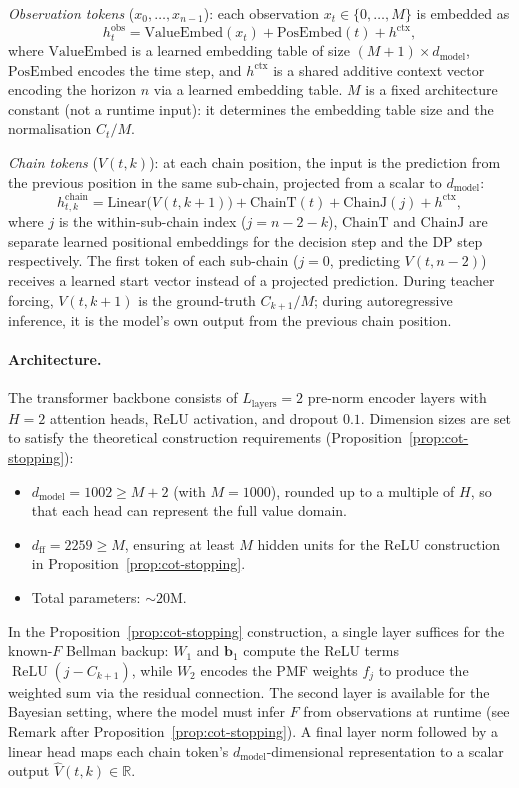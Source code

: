 \emph{Observation tokens} ($x_0, \ldots, x_{n-1}$): each observation $x_t \in \{0, \ldots, M\}$ is embedded as
\[
  h_t^{\mathrm{obs}} = \mathrm{ValueEmbed}(x_t) + \mathrm{PosEmbed}(t) + h^{\mathrm{ctx}},
\]
where $\mathrm{ValueEmbed}$ is a learned embedding table of size $(M{+}1) \times d_{\mathrm{model}}$, $\mathrm{PosEmbed}$ encodes the time step, and $h^{\mathrm{ctx}}$ is a shared additive context vector encoding the horizon $n$ via a learned embedding table. $M$ is a fixed architecture constant (not a runtime input): it determines the embedding table size and the normalisation $C_t / M$.

\emph{Chain tokens} ($V(t,k)$): at each chain position, the input is the prediction from the previous position in the same sub-chain, projected from a scalar to $d_{\mathrm{model}}$:
\[
  h^{\mathrm{chain}}_{t,k} = \mathrm{Linear}\bigl(V(t, k{+}1)\bigr) + \mathrm{ChainT}(t) + \mathrm{ChainJ}(j) + h^{\mathrm{ctx}},
\]
where $j$ is the within-sub-chain index ($j = n{-}2{-}k$), $\mathrm{ChainT}$ and $\mathrm{ChainJ}$ are separate learned positional embeddings for the decision step and the DP step respectively. The first token of each sub-chain ($j=0$, predicting $V(t, n{-}2)$) receives a learned start vector instead of a projected prediction. During teacher forcing, $V(t, k{+}1)$ is the ground-truth $C_{k+1}/M$; during autoregressive inference, it is the model's own output from the previous chain position.

\paragraph{Architecture.}
The transformer backbone consists of $L_{\mathrm{layers}} = 2$ pre-norm encoder layers with $H = 2$ attention heads, ReLU activation, and dropout $0.1$. Dimension sizes are set to satisfy the theoretical construction requirements (Proposition~\ref{prop:cot-stopping}):
\begin{itemize}
    \item $d_{\mathrm{model}} = 1002 \ge M + 2$ (with $M = 1000$), rounded up to a multiple of $H$, so that each head can represent the full value domain.
    \item $d_{\mathrm{ff}} = 2259 \ge M$, ensuring at least $M$ hidden units for the ReLU construction in Proposition~\ref{prop:cot-stopping}.
    \item Total parameters: ${\sim}20$M.
\end{itemize}
In the Proposition~\ref{prop:cot-stopping} construction, a single layer suffices for the known-$F$ Bellman backup: $W_1$ and $\mathbf{b}_1$ compute the ReLU terms $\operatorname{ReLU}(j - C_{k+1})$, while $W_2$ encodes the PMF weights $f_j$ to produce the weighted sum via the residual connection. The second layer is available for the Bayesian setting, where the model must infer $F$ from observations at runtime (see Remark after Proposition~\ref{prop:cot-stopping}). A final layer norm followed by a linear head maps each chain token's $d_{\mathrm{model}}$-dimensional representation to a scalar output $\hat{V}(t,k) \in \mathbb{R}$.

